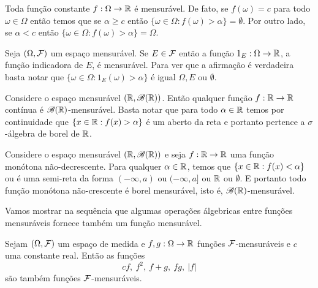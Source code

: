 \begin{exemplo}
	Toda função constante $f:\Omega\to\mathbb{R}$ é mensurável.
	De fato, se $f(\omega)=c$ para todo $\omega\in\Omega$ 
	então temos que se $\alpha\geq c$ então 
	$\{\omega\in\Omega: f(\omega)>\alpha\} =\emptyset$.
	Por outro lado, se $\alpha<c$ então 
	$\{\omega\in\Omega: f(\omega)>\alpha\} =\Omega$.
\end{exemplo}





\begin{exemplo}
	Seja $(\Omega,\mathcal{F})$ um espaço mensurável. 
	Se $E\in\mathcal{F}$ então a função $1_E:\Omega\to\mathbb{R}$, a função indicadora de $E$,
	é mensurável.
	Para ver que a afirmação é verdadeira basta notar que 
	$\{\omega\in\Omega: 1_{E}(\omega)>\alpha \}$ é igual $\Omega, E$
	ou $\emptyset$.
\end{exemplo}



\begin{exemplo}
	Considere o espaço mensurável $(\mathbb{R},\mathscr{B}(\mathbb{R}))$. 
	Então qualquer função $f:\mathbb{R}\to\mathbb{R}$ contínua é 
	$\mathscr{B}(\mathbb{R})$-mensurável.
	Basta notar que para todo $\alpha\in \mathbb{R}$ temos
	por continuidade que $\{x\in\mathbb{R}: f(x)>\alpha\}$ é 
	um aberto da reta e portanto pertence a $\sigma$-álgebra
	de borel de $\mathbb{R}$.
\end{exemplo}




\begin{exemplo}
	Considere o espaço mensurável $(\mathbb{R},\mathscr{B}(\mathbb{R}))$ e 
	seja $f:\mathbb{R}\to\mathbb{R}$ uma função monótona não-decrescente.
	Para qualquer $\alpha\in\mathbb{R}$, 
	temos que $\{x\in\mathbb{R}: f(x)<\alpha\}$ ou é uma semi-reta
	da forma $(-\infty,a)$ ou $(-\infty,a]$ ou $\mathbb{R}$ ou $\emptyset$.
	E portanto todo função monótona não-crescente é borel 
	mensurável, isto é, $\mathscr{B}(\mathbb{R})$-mensurável.
\end{exemplo}


Vamos mostrar na sequência que algumas operações álgebricas
entre funções mensuráveis fornece também um função mensurável.

\begin{lema}
	Sejam $(\Omega,\mathcal{F})$ um espaço de medida e 
	$f,g:\Omega\to\mathbb{R}$ funções $\mathcal{F}$-mensuráveis 
	e $c$ uma constante real. Então as funções 
	\[
		cf,\ f^2,\ f+g,\ fg,\ |f|
	\]
 	são também funções $\mathcal{F}$-mensuráveis.
\end{lema} 



